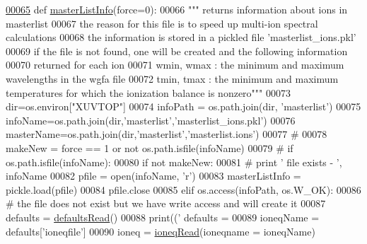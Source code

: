 \begin{DoxyCode}
\hypertarget{namespacepyneb_1_1utils_1_1__chianti__tools_l00065}{}\hyperlink{namespacepyneb_1_1utils_1_1__chianti__tools_a5677fc0d50bd22a853c14b4b2606b89e}{00065} \textcolor{keyword}{def }\hyperlink{namespacepyneb_1_1utils_1_1__chianti__tools_a5677fc0d50bd22a853c14b4b2606b89e}{masterListInfo}(force=0):
00066     \textcolor{stringliteral}{""" returns information about ions in masterlist}
00067 \textcolor{stringliteral}{    the reason for this file is to speed up multi-ion spectral calculations}
00068 \textcolor{stringliteral}{    the information is stored in a pickled file 'masterlist\_ions.pkl'}
00069 \textcolor{stringliteral}{    if the file is not found, one will be created and the following information}
00070 \textcolor{stringliteral}{    returned for each ion}
00071 \textcolor{stringliteral}{    wmin, wmax :  the minimum and maximum wavelengths in the wgfa file}
00072 \textcolor{stringliteral}{    tmin, tmax :  the minimum and maximum temperatures for which the ionization balance is nonzero"""}
00073     dir=os.environ[\textcolor{stringliteral}{"XUVTOP"}]
00074     infoPath = os.path.join(dir, \textcolor{stringliteral}{'masterlist'})
00075     infoName=os.path.join(dir,\textcolor{stringliteral}{'masterlist'},\textcolor{stringliteral}{'masterlist\_ions.pkl'})
00076     masterName=os.path.join(dir,\textcolor{stringliteral}{'masterlist'},\textcolor{stringliteral}{'masterlist.ions'})
00077     \textcolor{comment}{#}
00078     makeNew = force == 1 \textcolor{keywordflow}{or} \textcolor{keywordflow}{not} os.path.isfile(infoName)
00079 \textcolor{comment}{#    if os.path.isfile(infoName):}
00080     \textcolor{keywordflow}{if} \textcolor{keywordflow}{not} makeNew:
00081 \textcolor{comment}{#       print ' file exists - ',  infoName}
00082         pfile = open(infoName, \textcolor{stringliteral}{'}\textcolor{stringliteral}{r')}
00083 \textcolor{stringliteral}{        masterListInfo = pickle.load(pfile)}
00084 \textcolor{stringliteral}{        pfile.close}
00085 \textcolor{stringliteral}{    }\textcolor{keywordflow}{elif} os.access(infoPath, os.W\_OK):
00086         \textcolor{comment}{# the file does not exist but we have write access and will create it}
00087         defaults = \hyperlink{namespacepyneb_1_1utils_1_1__chianti__tools_a235ada2c4e384f436dbade0913107585}{defaultsRead}()
00088         print((\textcolor{stringliteral}{' defaults = %
00089         ioneqName = defaults[\textcolor{stringliteral}{'ioneqfile'}]
00090         ioneq = \hyperlink{namespacepyneb_1_1utils_1_1__chianti__tools_a8b6257cfe133ac906966b20c8721f82a}{ioneqRead}(ioneqname = ioneqName)
}
\end{DoxyCode}
